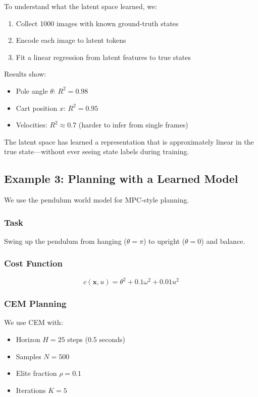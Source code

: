 To understand what the latent space learned, we:
\begin{enumerate}
    \item Collect 1000 images with known ground-truth states
    \item Encode each image to latent tokens
    \item Fit a linear regression from latent features to true states
\end{enumerate}

Results show:
\begin{itemize}
    \item Pole angle $\theta$: $R^2 = 0.98$
    \item Cart position $x$: $R^2 = 0.95$
    \item Velocities: $R^2 \approx 0.7$ (harder to infer from single frames)
\end{itemize}

The latent space has learned a representation that is approximately linear in the true state---without ever seeing state labels during training.

\subsection{Example 3: Planning with a Learned Model}

We use the pendulum world model for MPC-style planning.

\subsubsection{Task}

Swing up the pendulum from hanging ($\theta = \pi$) to upright ($\theta = 0$) and balance.

\subsubsection{Cost Function}

\begin{equation}
c(\mathbf{x}, u) = \theta^2 + 0.1\omega^2 + 0.01u^2
\end{equation}

\subsubsection{CEM Planning}

We use CEM with:
\begin{itemize}
    \item Horizon $H = 25$ steps (0.5 seconds)
    \item Samples $N = 500$
    \item Elite fraction $\rho = 0.1$
    \item Iterations $K = 5$
\end{itemize}


